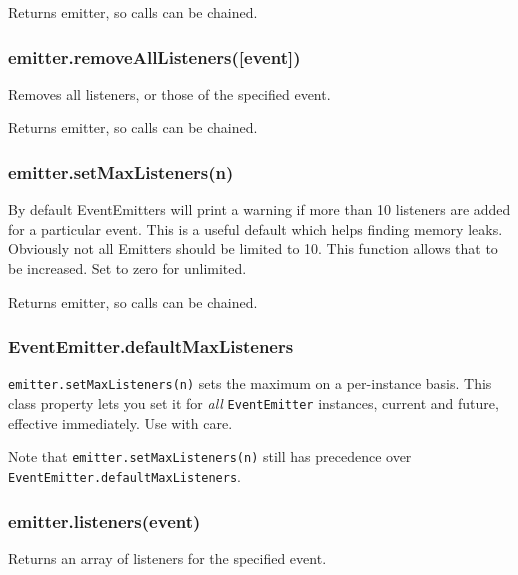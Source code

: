 Returns emitter, so calls can be chained.

\subsubsection{emitter.removeAllListeners({[}event{]})}\label{emitter.removealllistenersevent}

Removes all listeners, or those of the specified event.

Returns emitter, so calls can be chained.

\subsubsection{emitter.setMaxListeners(n)}\label{emitter.setmaxlistenersn}

By default EventEmitters will print a warning if more than 10 listeners
are added for a particular event. This is a useful default which helps
finding memory leaks. Obviously not all Emitters should be limited to
10. This function allows that to be increased. Set to zero for
unlimited.

Returns emitter, so calls can be chained.

\subsubsection{EventEmitter.defaultMaxListeners}\label{eventemitter.defaultmaxlisteners}

\texttt{emitter.setMaxListeners(n)} sets the maximum on a per-instance
basis. This class property lets you set it for \emph{all}
\texttt{EventEmitter} instances, current and future, effective
immediately. Use with care.

Note that \texttt{emitter.setMaxListeners(n)} still has precedence over
\texttt{EventEmitter.defaultMaxListeners}.

\subsubsection{emitter.listeners(event)}\label{emitter.listenersevent}

Returns an array of listeners for the specified event.

\begin{Shaded}
\begin{Highlighting}[]
\NormalTok{(}\NormalTok{, } 
  \NormalTok{(}\NormalTok{);}
\NormalTok{\});}
\NormalTok{(}\NormalTok{(}\NormalTok{(}\NormalTok{))); }\CommentTok{// [ [Function] ]}
\end{Highlighting}
\end{Shaded}

